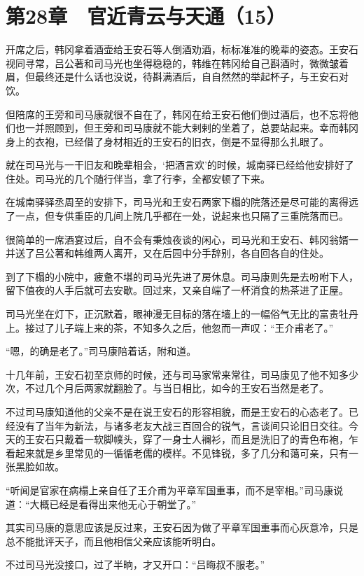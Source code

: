 \section{第28章　官近青云与天通（15）}

开席之后，韩冈拿着酒壶给王安石等人倒酒劝酒，标标准准的晚辈的姿态。王安石视同寻常，吕公著和司马光也坐得稳稳的，韩维在韩冈给自己斟酒时，微微皱着眉，但最终还是什么话也没说，待斟满酒后，自自然然的举起杯子，与王安石对饮。

但陪席的王旁和司马康就很不自在了，韩冈在给王安石他们倒过酒后，也不忘将他们也一并照顾到，但王旁和司马康就不能大剌剌的坐着了，总要站起来。幸而韩冈身上的衣袍，已经借了身材相近的王安石的旧衣，倒是不显得那么扎眼了。

就在司马光与一干旧友和晚辈相会，‘把酒言欢’的时候，城南驿已经给他安排好了住处。司马光的几个随行伴当，拿了行李，全都安顿了下来。

在城南驿驿丞周至的安排下，司马光和王安石两家下榻的院落还是尽可能的离得远了一点，但专供重臣的几间上院几乎都在一处，说起来也只隔了三重院落而已。

很简单的一席酒宴过后，自不会有秉烛夜谈的闲心，司马光和王安石、韩冈翁婿一并送了吕公著和韩维两人离开，又在后园中分手辞别，各自回各自的住处。

到了下榻的小院中，疲惫不堪的司马光先进了房休息。司马康则先是去吩咐下人，留下值夜的人手后就可去安歇。回过来，又亲自端了一杯消食的热茶进了正屋。

司马光坐在灯下，正沉默着，眼神漫无目标的落在墙上的一幅俗气无比的富贵牡丹上。接过了儿子端上来的茶，不知多久之后，他忽而一声叹：“王介甫老了。”

“嗯，的确是老了。”司马康陪着话，附和道。

十几年前，王安石初至京师的时候，还与司马家常来常往，司马康见了他不知多少次，不过几个月后两家就翻脸了。与当日相比，如今的王安石当然是老了。

不过司马康知道他的父亲不是在说王安石的形容相貌，而是王安石的心态老了。已经没有了当年为新法，与诸多老友大战三百回合的锐气，言谈间只论旧日交往。今天的王安石只戴着一软脚幞头，穿了一身士人襕衫，而且是洗旧了的青色布袍，乍看起来就是乡里常见的一循循老儒的模样。不见锋锐，多了几分和蔼可亲，只有一张黑脸如故。

“听闻是官家在病榻上亲自任了王介甫为平章军国重事，而不是宰相。”司马康说道：“大概已经是看得出来他无心于朝堂了。”

其实司马康的意思应该是反过来，王安石因为做了平章军国重事而心灰意冷，只是总不能批评天子，而且他相信父亲应该能听明白。

不过司马光没接口，过了半晌，才又开口：“吕晦叔不服老。”

